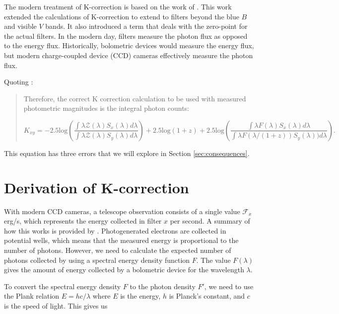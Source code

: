 \documentclass[linenumbers]{aastex631}
\begin{document}
The modern treatment of K-correction is based on the work of \citet{kim1996}.
This work extended the calculations of K-correction to extend to filters beyond
the blue $B$ and visible $V$ bands. It also introduced a term that deals with
the zero-point for the actual filters. In the modern day, filters measure the
photon flux as opposed to the energy flux. Historically, bolometric devices
would measure the energy flux, but modern charge-coupled device (CCD) cameras
effectively measure the photon flux.

Quoting \citet{kim1996}:

\begin{quote}
  Therefore, the correct K correction calculation to be used with measured
  photometric magnitudes is the integral photon counts:

  \begin{equation}
  \label{eq:kim}
    K_{xy} =
      -2.5\text{log} \left(
        \frac{\int \lambda \mathcal{Z}(\lambda)S_x(\lambda)d\lambda}
             {\int \lambda \mathcal{Z}(\lambda)S_y(\lambda)d\lambda}\right)
      + 2.5\text{log}(1+z)
      + 2.5\text{log}\left(
        \frac{\int \lambda F(\lambda)S_x(\lambda)d\lambda}
             {\int \lambda F(\lambda/(1+z))S_y(\lambda))d\lambda}\right).
  \end{equation}
\end{quote}

This equation has three errors that we will explore in Section
\ref{sec:consequences}.

\section{Derivation of K-correction}
\label{sec:derivation}

With modern CCD cameras, a telescope observation consists of a single value
$\mathcal{F}_x$ erg/s, which represents the energy collected in filter $x$ per
second. A summary of how this works is provided by \citet{lesser2015}.
Photogenerated electrons are collected in potential wells, which means that the
measured energy is proportional to the number of photons. However, we need to
calculate the expected number of photons collected by using a spectral energy
density function $F$. The value $F(\lambda)$ gives the amount of energy
collected by a bolometric device for the wavelength $\lambda$.

To convert the spectral energy density $F$ to the photon density $F'$, we need
to use the Plank relation $E = hc / \lambda$ where $E$ is the energy, $h$
is Planck's constant, and $c$ is the speed of light. This gives us
\end{document}

